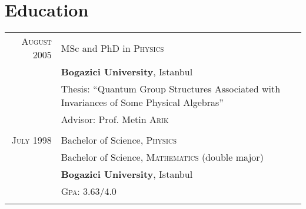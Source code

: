 \documentclass[a4paper,10pt]{article}
\begin{document}
\section{Education}
\begin{longtable}{r|p{11cm}}
  \textsc{August} 2005  & MSc and PhD in \textsc{Physics} \\
                        & \textbf{Bogazici University}, Istanbul\\
                        & Thesis: ``Quantum Group Structures Associated with Invariances of Some Physical Algebras'' \\
                        & \small Advisor: Prof. Metin \textsc{Arik}\\
  \multicolumn{2}{c}{} \\

  \textsc{July} 1998    & Bachelor of Science, \textsc{Physics} \\
                        & Bachelor of Science, \textsc{Mathematics} (double major) \\
                        & \normalsize\textbf{Bogazici University}, Istanbul \\
                        & \normalsize \textsc{Gpa}: 3.63/4.0 \\
  \multicolumn{2}{c}{} \\

\end{longtable}

\newpage
\end{document}
